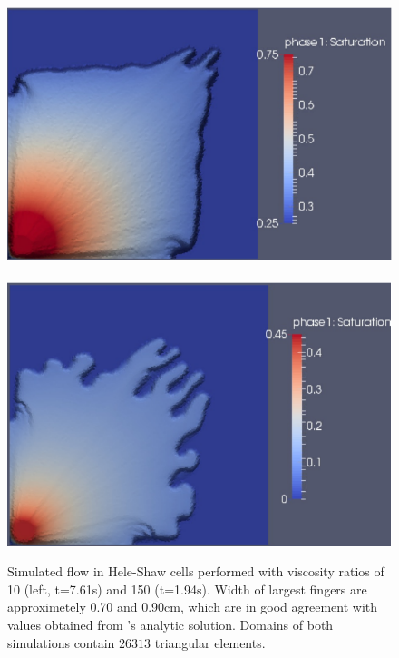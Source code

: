 \begin{landscape}
\begin{figure}[ht] 
\hbox{\includegraphics[width=.5\textwidth]{./Pics1/Saffman_homogeneous_VR10/ST_Homog_VR10_D2201_bbd}
       \includegraphics[width=.49\textwidth]{./Pics1/Saffman_homogeneous_VR150/ST_Homog_VR150_D5003_k2b}}
\caption{Simulated flow in Hele-Shaw cells performed with viscosity ratios of 10 (left, t=7.61s) and 150 (t=1.94s). Width of largest fingers are approximetely 0.70 and 0.90cm, which are in good agreement with values obtained from \citet{guan_2003}'s analytic solution. Domains of both simulations contain $26313$  triangular elements.}
\label{fig:homoheleshaw_VN10_VN150}
\end{figure}
\end{landscape}



